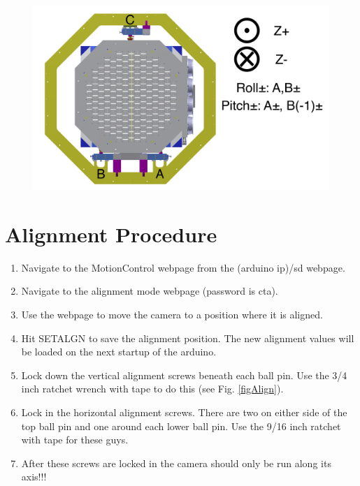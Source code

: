 \documentclass[11pt]{article}
\begin{document}
\begin{figure}[h]
\begin{center}
\includegraphics[width = 4.5in]{camerapic.png}
\caption{}  
\label{fd2}
\end{center}
\end{figure}


\section{Alignment Procedure}
\label{alignSec}
\begin{enumerate}
	\item Navigate to the MotionControl webpage from the (arduino ip)/sd webpage.
	\item Navigate to the alignment mode webpage (password is cta).
	\item Use the webpage to move the camera to a position where it is aligned.
	\item Hit SETALGN to save the alignment position.  The new alignment values will be loaded on the next startup of the arduino.
	\item Lock down the vertical alignment screws beneath each ball pin.  Use the 3/4 inch ratchet wrench with tape to do this (see Fig. \ref{figAlign}).
	\item Lock in the horizontal alignment screws.  There are two on either side of the top ball pin and one around each lower ball pin.
		Use the 9/16 inch ratchet with tape for these guys.
	\item After these screws are locked in the camera should only be run along its axis!!!
\end{enumerate}
\end{document}
